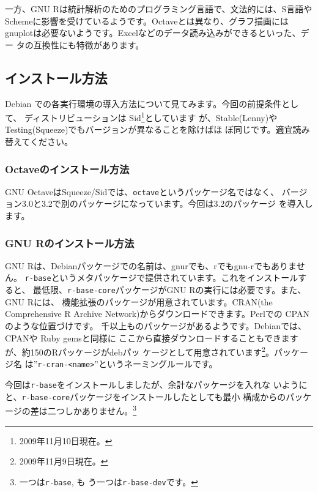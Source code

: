 \documentclass[mingoth,a4paper]{jsarticle}
\begin{document}
一方、GNU Rは統計解析のためのプログラミング言語で、文法的には、S言語や
Schemeに影響を受けているようです。Octaveとは異なり、グラフ描画には
gnuplotは必要ないようです。Excelなどのデータ読み込みができるといった、デー
タの互換性にも特徴があります。


\subsection{インストール方法}

Debian での各実行環境の導入方法について見てみます。今回の前提条件として、
ディストリビューションは Sid\footnote{2009年11月10日現在。}としています
が、Stable(Lenny)や Testing(Squeeze)でもバージョンが異なることを除けばほ
ぼ同じです。適宜読み替えてください。

\subsubsection{Octaveのインストール方法}

GNU OctaveはSqueeze/Sidでは、\texttt{octave}というパッケージ名ではなく、
バージョン3.0と3.2で別のパッケージになっています。今回は3.2のパッケージ
を導入します。


\subsubsection{GNU Rのインストール方法}

GNU Rは、Debianパッケージでの名前は、gnurでも、rでもgnu-rでもありません。
\texttt{r-base}というメタパッケージで提供されています。これをインストールすると、
最低限、\texttt{r-base-core}パッケージがGNU Rの実行には必要です。また、GNU Rには、
機能拡張のパッケージが用意されています。CRAN(the Comprehensive R Archive
Network)からダウンロードできます。Perlでの CPAN のような位置づけです。
千以上ものパッケージがあるようです。Debianでは、CPANや Ruby gemsと同様に
ここから直接ダウンロードすることもできますが、約150のRパッケージがdebパッ
ケージとして用意されています\footnote{2009年11月9日現在。}。パッケージ名
は''\texttt{r-cran-<name>}''というネーミングルールです。

今回は\texttt{r-base}をインストールしましたが、余計なパッケージを入れな
いようにと、\texttt{r-base-core}パッケージをインストールしたとしても最小
構成からのパッケージの差は二つしかありません。\footnote{一つは\texttt{r-base}, も
う一つは\texttt{r-base-dev}です。}
\end{document}
